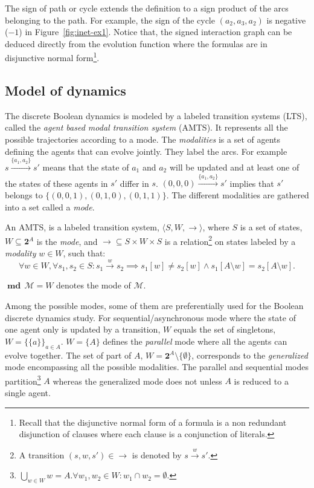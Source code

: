 \documentclass[12pt]{elsarticle}
\newcommand{\tuple}[1]{\langle #1 \rangle}
\newcommand{\partset}[1]{\ensuremath{\textbf{2}^{#1}}}
\newcommand{\evo}[0]{\longrightarrow}
\newcommand{\xevo}[1]{\stackrel{#1}{\evo}}
\newcommand{\mode}[0]{\operatorname{\textbf{md}} \,}
\renewcommand{\land}[0]{.}
\begin{document}
The sign of path or cycle extends the definition to a sign product of the arcs belonging to the path. For example, the sign of the cycle $(a_2,a_3,a_2)$ is negative ($-1$) in Figure~\ref{fig:inet-ex1}. Notice that, the signed interaction graph can be deduced directly from the evolution function where the formulas are in disjunctive normal form\footnote{Recall that the disjunctive normal form of a formula is a non redundant disjunction of clauses where each clause is a conjunction of literals.}. 



\subsection{Model of dynamics}
The discrete Boolean dynamics is modeled by a labeled transition systems (LTS), called the \emph{agent based modal transition system} (AMTS). It represents all the possible trajectories according to a mode. The \emph{modalities} is a set of agents defining the agents that can evolve jointly. They label the arcs. For example $s \xevo{\{a_1,a_2\}} s'$ means that the state of $a_1$ and $a_2$ will be updated and at least one of the states of these agents in $s'$ differ in $s$. $(0,0,0) \xevo{\{a_1,a_2\}} s'$ implies that $s'$ belongs to $\{(0,0,1),(0,1,0),(0,1,1) \}$. The different modalities are gathered into a set called a \emph{mode}. 
\begin{definition}
\label{def:amts}
An AMTS, is a labeled transition system, $\tuple{S,W,\evo}$, where $S$ is a set of states, $W\subseteq \partset{A}$ is the \emph{mode}, and $\evo \subseteq S \times W \times S$ is a relation\footnote{A transition $(s,w,s') \in \evo$ is denoted by $s \xevo w s'$.} on states labeled by a \emph{modality} $w \in W$, such that: 
$$\forall w \in W, \forall s_1,s_2 \in S: s_1 \xevo w s_2 \implies s_1[w] \neq s_2[w] \wedge s_1[A\setminus w] = s_2[A \setminus w].$$ 

\noindent
$\mode \mathcal M = W$ denotes the mode of $\mathcal M$.
\end{definition}
Among the possible modes, some of them are preferentially used for the Boolean discrete dynamics study. For sequential/asynchronous mode where the state of one agent only is updated by a transition, $W$ equals the set of singletons, $W=\{\{a\}\}_{a \in A}$. $W=\{A\}$ defines the \emph{parallel} mode where all the agents can evolve together. The set of part of $A$, $W=\partset{A} \setminus \{ \emptyset \}$, corresponds to the \emph{generalized} mode encompassing all the possible modalities. The parallel and sequential modes partition\footnote{ $\bigcup_{w\in W} w= A \land \forall w_1,w_2 \in W: w_1 \cap w_2 = \emptyset$.} $A$ whereas the generalized mode does not unless $A$ is reduced to a single agent. 
\end{document}
